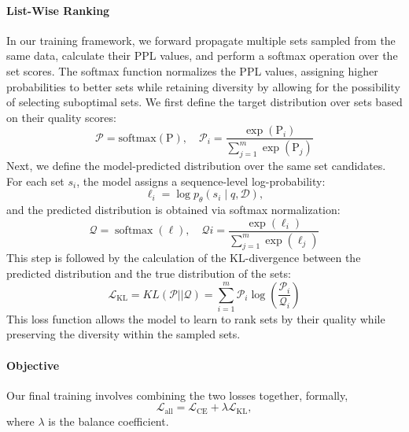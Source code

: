 \documentclass[11pt]{article}
\begin{document}
\paragraph{List-Wise Ranking}
In our training framework, we forward propagate multiple sets sampled from the same data, calculate their PPL values, and perform a softmax operation over the set scores. The softmax function normalizes the PPL values, assigning higher probabilities to better sets while retaining diversity by allowing for the possibility of selecting suboptimal sets. 
We first define the target distribution over sets based on their quality scores: 
\begin{equation}
    \label{eq:p_distribution}
    \mathcal{P} = \text{softmax}(\text{P}), \quad \mathcal{P}_i =  \frac{\exp(\text{P}_i)}{\sum_{j=1}^{m} \exp(\text{P}_j)}
\end{equation}
Next, we define the model-predicted distribution over the same set candidates. For each set $s_i$, the model assigns a sequence-level log-probability:
\begin{equation}
\ell_i = \log p_\theta(s_i \mid q, \mathcal{D}),
\end{equation}
and the predicted distribution is obtained via softmax normalization:
\begin{equation}
\label{eq:q_distribution}
\mathcal{Q} = \operatorname{softmax}(\boldsymbol{\ell}),
\quad
\mathcal{Q}i = \frac{\exp(\ell_i)}{\sum_{j=1}^{m}\exp(\ell_j)}
\end{equation}
This step is followed by the calculation of the KL-divergence between the predicted distribution and the true distribution of the sets:
\begin{equation}
\label{eq:kl}
\mathcal{L}_\text{KL} = KL(\mathcal{P}||\mathcal{Q}) = \sum_{i=1}^{m} \mathcal{P}_i \log \left( \frac{\mathcal{P}_i}{\mathcal{Q}_i} \right)
\end{equation}
This loss function allows the model to learn to rank sets by their quality while preserving the diversity within the sampled sets.



\paragraph{Objective}
Our final training involves combining the two losses together, formally, 
\begin{equation}
\label{eq:loss}
    \mathcal{L}_\text{all} = \mathcal{L}_\text{CE} + \lambda\mathcal{L}_\text{KL},
\end{equation}
where $\lambda$ is the balance coefficient.
\end{document}
